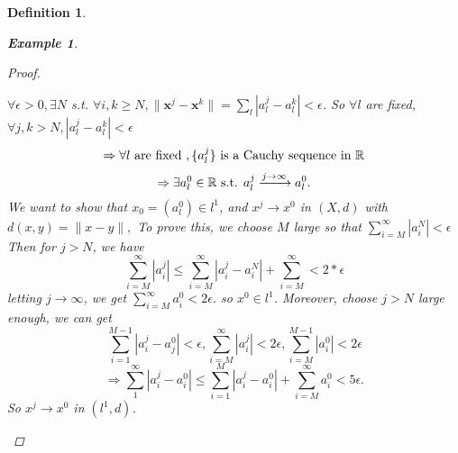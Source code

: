 \documentclass{article}
\newtheorem*{definition}{Definition}
\newtheorem*{example}{Example}
\begin{document}
\begin{definition}
\begin{example}
\begin{enumerate}
\begin{proof}
\begin{itemize}
                    $\forall \epsilon > 0, \exists N$ s.t. $\forall i, k \ge N, \|\mathbf{x}^j - \mathbf{x}^k\| = \sum_{l}|a_l^j - a_l^k| < \epsilon$.
                    So $\forall l$ are fixed, $\forall j, k > N, |a_l^j - a_l^k| < \epsilon$
                    \[
                       \Rightarrow \forall l \textnormal{ are fixed }, \{a_l^j\} \textnormal{ is a Cauchy sequence in }\mathbb{R} 
                    \]
                    \[
                        \Rightarrow \exists a_l^0 \in \mathbb{R} \textnormal{ s.t. } a_l^j \xrightarrow{j \rightarrow \infty} a_l^0.
                    \]
                    We want to show that $x_0=(a_l^0) \in l^1$, and $x^j \rightarrow x^0$ in $(X, d)$ with $d(x, y) = \|x -y\|, $
                    To prove this, we choose $M$ large so that $\sum_{i=M}^{\infty}{|a_i^N|} < \epsilon$
                    Then for $j > N$, we have
                    \[
                        \sum_{i=M}^{\infty}{|a_i^j|} \le \sum_{i=M}^{\infty}{|a_i^j - a_i^N| + \sum_{i=M}^{\infty}} < 2 * \epsilon
                    \]
                    letting $j \rightarrow \infty$, we get $\sum_{i=M}^{\infty}{a_i^0} < 2 \epsilon$. so $x^0 \in l^1$.
                    Moreover, choose $j > N$ large enough, we can get
                    \[
                        \sum_{i=1}^{M-1}{|a_i^j - a_j^0|} < \epsilon,
                        \sum_{i=M}^{\infty}{|a_i^j|} < 2\epsilon,
                        \sum_{i=M}^{M-1}{|a_i^0|} < 2\epsilon
                    \]
                    \[
                        \Rightarrow \sum_{1}^{\infty}{|a_i^j - a_i^0|} \le \sum_{i=1}^{M}{|a_i^j - a_i^0|} + \sum_{i=M}^{\infty}{a_i^0} < 5 \epsilon.
                    \]
                    So $x^j \rightarrow x^0$ in $(l^1, d)$.
                \end{itemize}        
            \end{proof}
        \end{enumerate}
    \end{example}
\end{definition}
\end{document}

